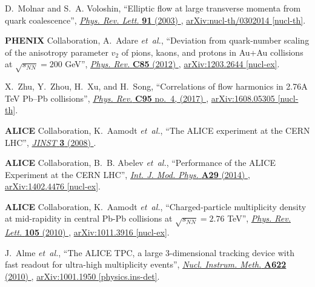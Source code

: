 \documentclass[ALICE,manyauthors]{cernphprep}
\begin{document}
\begin{thebibliography}{10}
D.~Molnar and S.~A. Voloshin, ``{Elliptic flow at large transverse momenta from
  quark coalescence}'',
  \href{http://dx.doi.org/10.1103/PhysRevLett.91.092301}{{\em Phys. Rev. Lett.}
  {\bfseries 91} (2003) },
\href{http://arxiv.org/abs/nucl-th/0302014}{{\ttfamily arXiv:nucl-th/0302014
  [nucl-th]}}.

{\bfseries PHENIX} Collaboration, A.~Adare {\em et~al.}, ``{Deviation from
  quark-number scaling of the anisotropy parameter $v_2$ of pions, kaons, and
  protons in Au+Au collisions at $\sqrt{s_{NN}} = 200$ GeV}'',
  \href{http://dx.doi.org/10.1103/PhysRevC.85.064914}{{\em Phys. Rev.}
  {\bfseries C85} (2012) },
\href{http://arxiv.org/abs/1203.2644}{{\ttfamily arXiv:1203.2644 [nucl-ex]}}.

X.~Zhu, Y.~Zhou, H.~Xu, and H.~Song, ``{Correlations of flow harmonics in 2.76A
  TeV Pb--Pb collisions}'',
  \href{http://dx.doi.org/10.1103/PhysRevC.95.044902}{{\em Phys. Rev.}
  {\bfseries C95} no.~4, (2017) },
\href{http://arxiv.org/abs/1608.05305}{{\ttfamily arXiv:1608.05305 [nucl-th]}}.

{\bfseries ALICE} Collaboration, K.~Aamodt {\em et~al.}, ``{The ALICE
  experiment at the CERN LHC}'',
\href{http://dx.doi.org/10.1088/1748-0221/3/08/S08002}{{\em JINST} {\bfseries
  3} (2008) }.

{\bfseries ALICE} Collaboration, B.~B. Abelev {\em et~al.}, ``{Performance of
  the ALICE Experiment at the CERN LHC}'',
  \href{http://dx.doi.org/10.1142/S0217751X14300440}{{\em Int. J. Mod. Phys.}
  {\bfseries A29} (2014) },
\href{http://arxiv.org/abs/1402.4476}{{\ttfamily arXiv:1402.4476 [nucl-ex]}}.

{\bfseries ALICE} Collaboration, K.~Aamodt {\em et~al.}, ``{Charged-particle
  multiplicity density at mid-rapidity in central Pb-Pb collisions at
  $\sqrt{s_{NN}} = 2.76$ TeV}'',
  \href{http://dx.doi.org/10.1103/PhysRevLett.105.252301}{{\em Phys. Rev.
  Lett.} {\bfseries 105} (2010) },
\href{http://arxiv.org/abs/1011.3916}{{\ttfamily arXiv:1011.3916 [nucl-ex]}}.

J.~Alme {\em et~al.}, ``{The ALICE TPC, a large 3-dimensional tracking device
  with fast readout for ultra-high multiplicity events}'',
  \href{http://dx.doi.org/10.1016/j.nima.2010.04.042}{{\em Nucl. Instrum.
  Meth.} {\bfseries A622} (2010) },
\href{http://arxiv.org/abs/1001.1950}{{\ttfamily arXiv:1001.1950
  [physics.ins-det]}}.


\end{thebibliography}
\end{document}
